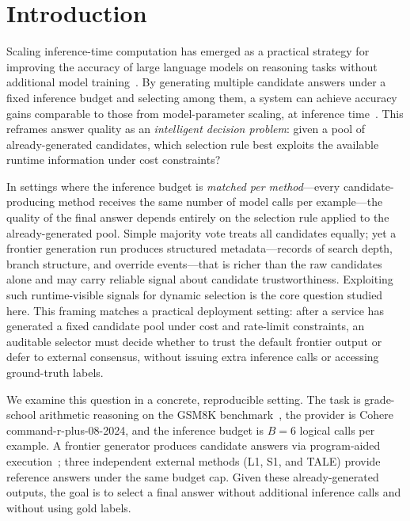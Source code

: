 \section{Introduction}
\label{sec:introduction}

Scaling inference-time computation has emerged as a practical strategy for improving
the accuracy of large language models on reasoning tasks without additional model
training~\citep{snell2024scaling}.
By generating multiple candidate answers under a fixed inference budget and selecting
among them, a system can achieve accuracy gains comparable to those from model-parameter
scaling, at inference time~\citep{wang2023selfconsistency}.
This reframes answer quality as an \emph{intelligent decision problem}: given a pool of
already-generated candidates, which selection rule best exploits the available runtime
information under cost constraints?

In settings where the inference budget is \emph{matched per method}---every
candidate-producing method receives the same number of model calls per example---the
quality of the final answer depends entirely on the selection rule applied to the
already-generated pool.
Simple majority vote treats all candidates equally; yet a frontier generation run
produces structured metadata---records of search depth, branch structure, and override
events---that is richer than the raw candidates alone and may carry reliable signal
about candidate trustworthiness.
Exploiting such runtime-visible signals for dynamic selection is the core question
studied here.
This framing matches a practical deployment setting: after a service has generated a
fixed candidate pool under cost and rate-limit constraints, an auditable selector must
decide whether to trust the default frontier output or defer to external consensus,
without issuing extra inference calls or accessing ground-truth labels.

We examine this question in a concrete, reproducible setting.
The task is grade-school arithmetic reasoning on the GSM8K
benchmark~\citep{cobbe2021training}, the provider is Cohere command-r-plus-08-2024,
and the inference budget is $B = 6$ logical calls per example.
A frontier generator produces candidate answers via program-aided
execution~\citep{gao2023pal}; three independent external methods (L1, S1, and TALE)
provide reference answers under the same budget cap.
Given these already-generated outputs, the goal is to select a final answer without
additional inference calls and without using gold labels.

